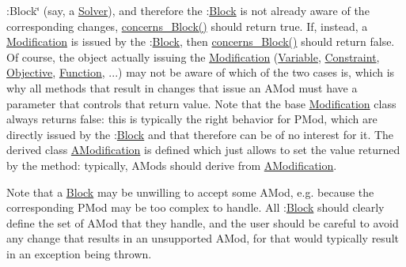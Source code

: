 \+:\+Block\char`\"{} (say, a \mbox{\hyperlink{class_s_m_spp__di__unipi__it_1_1_solver}{Solver}}), and therefore the \+:\mbox{\hyperlink{class_s_m_spp__di__unipi__it_1_1_block}{Block}} is not already aware of the corresponding changes, \mbox{\hyperlink{class_s_m_spp__di__unipi__it_1_1_modification_a22fe0cccfc755cfd89b240587d1f1cad}{concerns\+\_\+\+Block()}} should return true. If, instead, a \mbox{\hyperlink{class_s_m_spp__di__unipi__it_1_1_modification}{Modification}} is issued by the \+:\mbox{\hyperlink{class_s_m_spp__di__unipi__it_1_1_block}{Block}}, then \mbox{\hyperlink{class_s_m_spp__di__unipi__it_1_1_modification_a22fe0cccfc755cfd89b240587d1f1cad}{concerns\+\_\+\+Block()}} should return false. Of course, the object actually issuing the \mbox{\hyperlink{class_s_m_spp__di__unipi__it_1_1_modification}{Modification}} (\mbox{\hyperlink{class_s_m_spp__di__unipi__it_1_1_variable}{Variable}}, \mbox{\hyperlink{class_s_m_spp__di__unipi__it_1_1_constraint}{Constraint}}, \mbox{\hyperlink{class_s_m_spp__di__unipi__it_1_1_objective}{Objective}}, \mbox{\hyperlink{class_s_m_spp__di__unipi__it_1_1_function}{Function}}, ...) may not be aware of which of the two cases is, which is why all methods that result in changes that issue an A\+Mod must have a parameter that controls that return value. Note that the base \mbox{\hyperlink{class_s_m_spp__di__unipi__it_1_1_modification}{Modification}} class always returns false\+: this is typically the right behavior for P\+Mod, which are directly issued by the \+:\mbox{\hyperlink{class_s_m_spp__di__unipi__it_1_1_block}{Block}} and that therefore can be of no interest for it. The derived class \mbox{\hyperlink{class_s_m_spp__di__unipi__it_1_1_a_modification}{A\+Modification}} is defined which just allows to set the value returned by the method\+: typically, A\+Mods should derive from \mbox{\hyperlink{class_s_m_spp__di__unipi__it_1_1_a_modification}{A\+Modification}}.

Note that a \mbox{\hyperlink{class_s_m_spp__di__unipi__it_1_1_block}{Block}} may be unwilling to accept some A\+Mod, e.\+g. because the corresponding P\+Mod may be too complex to handle. All \+:\mbox{\hyperlink{class_s_m_spp__di__unipi__it_1_1_block}{Block}} should clearly define the set of A\+Mod that they handle, and the user should be careful to avoid any change that results in an unsupported A\+Mod, for that would typically result in an exception being thrown.

